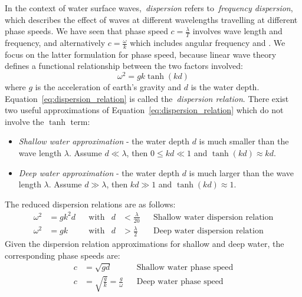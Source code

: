 In the context of water surface waves,~\emph{dispersion} refers to~\emph{frequency dispersion}, which describes
the effect of waves at different wavelengths travelling at different phase speeds. We have seen that
phase speed $c = \frac{\lambda}{T}$ involves wave length and frequency, and alternatively $c = \frac{\omega}{k}$
which includes angular frequency and \wavenumber. We focus on the latter formulation for phase speed, because
linear wave theory defines a functional relationship between the two factors involved:
\begin{equation}
\label{eq:dispersion_relation}
 \omega^2 = gk\tanh(kd)
\end{equation}
%
where $g$ is the acceleration of earth's gravity and $d$ is the water depth. Equation~\ref{eq:dispersion_relation}
is called the~\emph{dispersion relation}.
There exist two useful approximations of Equation~\ref{eq:dispersion_relation} which do not involve the $\tanh$ term:
\begin{itemize}
 \item \emph{Shallow water approximation} - the water depth $d$ is much smaller than the wave length $\lambda$.
 Assume $d \ll \lambda$, then $0 \leq kd \ll 1$ and $\tanh(kd) \approx kd$.
 \item \emph{Deep water approximation} - the water depth $d$ is much larger than the wave length $\lambda$.
 Assume $d \gg \lambda$, then $kd \gg 1$ and $\tanh(kd) \approx 1$.
\end{itemize}
%
The reduced dispersion relations are as follows:
\begin{align}
\label{eq:disp_rel_shallow_water}
\omega^2 & = gk^2d && \text{with} & d &< \frac{\lambda}{20}  && \text{Shallow 
water dispersion relation}\\
\label{eq:disp_rel_deep_water}
\omega^2 & = gk    && \text{with} & d &> \frac{\lambda}{2} && \text{Deep water 
dispersion relation}
\end{align}
%
Given the dispersion relation approximations for shallow and deep water, the corresponding
phase speeds are:
\begin{align}
 \label{eq:phase_speed_shallow_water} c &= \sqrt{gd} && \text{Shallow water phase speed}\\
  \label{eq:phase_speed_deep_water}   c &= \sqrt{\frac{g}{k}} = \frac{g}{\omega} && \text{Deep water phase speed}
\end{align}
